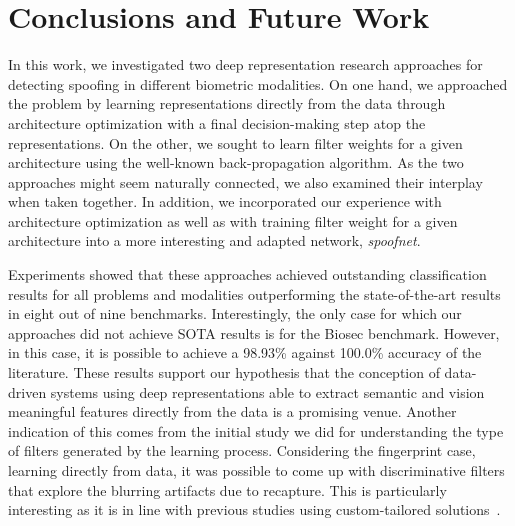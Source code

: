 \section{Conclusions and Future Work}
\label{sec:conclusions}

In this work, we investigated two deep representation research approaches for detecting spoofing in different biometric modalities. On one hand, we approached the problem by learning representations directly from the data through architecture optimization with a final decision-making step atop the representations. On the other, we sought to learn filter weights for a given architecture using the well-known back-propagation algorithm. As the two approaches might seem naturally connected, we also examined their interplay when taken together. In addition, we incorporated our experience with architecture optimization as well as with training filter weight for a given architecture into a more interesting and adapted network, \emph{spoofnet}.  

Experiments showed that these approaches achieved outstanding classification results for all problems and modalities outperforming the state-of-the-art results in eight out of nine benchmarks.
Interestingly, the only case for which our approaches did not achieve SOTA results is for the Biosec benchmark. However, in this case, it is possible to achieve a 98.93\% against 100.0\% accuracy of the literature.
These results support our hypothesis that the conception of data-driven systems using deep representations able to extract semantic and vision meaningful features directly from the data is a promising venue. Another indication of this comes from the initial study we did for understanding the type of filters generated by the learning process. Considering the fingerprint case, learning directly from data, it was possible to come up with discriminative filters that explore the blurring artifacts due to recapture. This is particularly interesting as it is in line with previous studies using custom-tailored solutions~\cite{Galbally:TIP:2014}.

